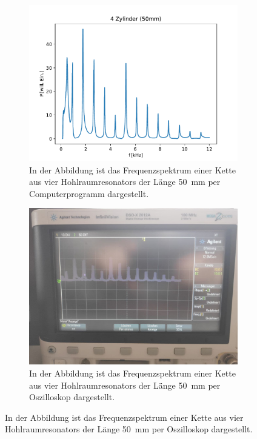 \begin{figure}
            \centering
            \begin{subfigure}[b]{0.45\textwidth}
                \centering
                \includegraphics[scale=0.4]{./pictures/4_Zylinder_50mm.pdf}
                \caption{In der Abbildung ist das Frequenzspektrum einer Kette aus vier Hohlraumresonators der Länge \SI{50}{\milli\metre} per Computerprogramm dargestellt.}
            \end{subfigure}
            \hfill
            \centering
            \begin{subfigure}[b]{0.45\textwidth}
                \centering
                \includegraphics[scale=0.13]{./pictures/4_Zylinder.jpg}
                \caption{In der Abbildung ist das Frequenzspektrum einer Kette aus vier Hohlraumresonators der Länge \SI{50}{\milli\metre} per Oszilloskop dargestellt.}
            \end{subfigure}


\end{figure}
